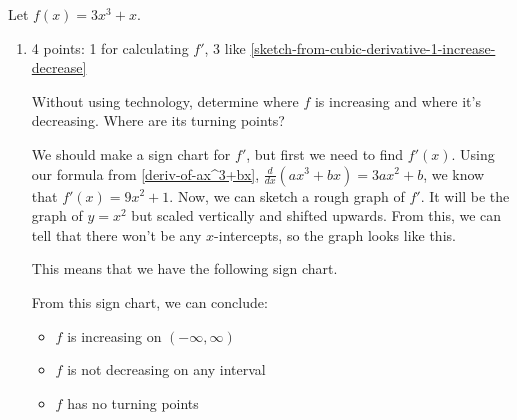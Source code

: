 \documentclass{article}
\begin{document}
\begin{enumerate}
  Let $f(x) = 3x^3 + x$.
  \begin{enumerate}
  \item

    \begin{grading}
      4 points: 1 for calculating $f'$, 3 like \ref{sketch-from-cubic-derivative-1-increase-decrease}
    \end{grading}

    \begin{problem}[\vfill]
      Without using technology, determine where $f$ is increasing and where it's decreasing. Where are its turning points? 
    \end{problem}

    \begin{solution}
      We should make a sign chart for $f'$, but first we need to find $f'(x)$. Using our formula from
      \ref{deriv-of-ax^3+bx}, $\frac{d}{dx}(ax^3+bx)=3ax^2+b$, we know that $f'(x)=9x^2+1$.
      Now, we can sketch a rough graph of $f'$. It will be the graph of $y=x^2$ but scaled vertically and shifted
      upwards. From this, we can tell that there won't be any $x$-intercepts, so the graph looks like this.

      \begin{center}
      \end{center}

      This means that we have the following sign chart.

      \begin{center}
      \end{center}

      From this sign chart, we can conclude:
      \begin{itemize}
        \item $f$ is increasing on $(-\infty, \infty)$
        \item $f$ is not decreasing on any interval
        \item $f$ has no turning points
      \end{itemize}
      

\end{solution}
\end{enumerate}
\end{enumerate}
\end{document}

